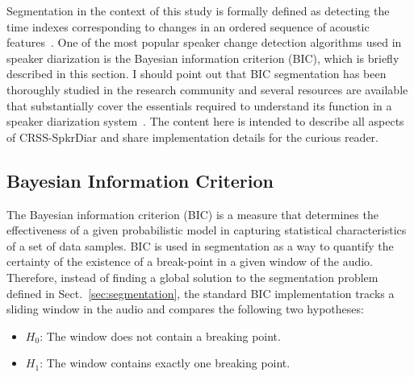 Segmentation in the context of this study is formally defined as detecting the time indexes corresponding to changes in an ordered sequence of acoustic features~\cite{cettolo2005evaluation}. 
One of the most popular speaker change detection algorithms used in speaker diarization is the Bayesian information criterion (BIC), which is briefly described in this section. 
I should point out that BIC segmentation has been thoroughly studied in the research community and several resources are available that substantially cover the essentials required to understand its function in a speaker diarization system~\cite{cettolo2003efficient,cettolo2005evaluation,chen1998BIC}. 
The content here is intended to describe all aspects of CRSS-SpkrDiar and share implementation details for the curious reader. 

\subsection{Bayesian Information Criterion}
\label{ssec:chDiar_secBIC}
The Bayesian information criterion (BIC) is a measure that determines the effectiveness of a given probabilistic model in capturing statistical characteristics of a set of data samples. 
BIC is used in segmentation as a way to quantify the certainty of the existence of a break-point in a given window of the audio. 
Therefore, instead of finding a global solution to the segmentation problem defined in Sect.~\ref{sec:segmentation}, the standard BIC implementation tracks a sliding window in the audio and compares the following two hypotheses: 
\begin{itemize}
	\item $H_0$: The window does not contain a breaking point. 
	\item $H_1$: The window contains exactly one breaking point. 
\end{itemize}

